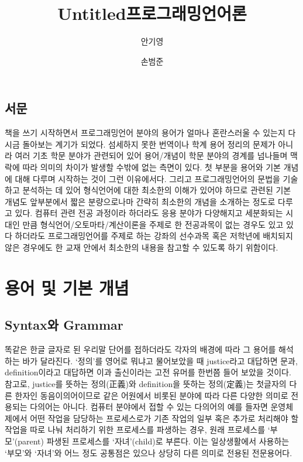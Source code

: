 \documentclass[b5paper,chapter,figtabcapt]{oblivoir}
\title{Untitled}
\title{프로그래밍언어론}
\author{안기영 \and 손범준}
\begin{document}
\maketitle

\frontmatter 

\chapter*{서문}
책을 쓰기 시작하면서 프로그래밍언어 분야의 용어가 얼마나 혼란스러울 수 있는지
다시금 돌아보는 계기가 되었다. 섬세하지 못한 번역이나 학계 용어 정리의 문제가
아니라 여러 기초 학문 분야가 관련되어 있어 용어/개념이 학문 분야의 경계를
넘나들며 맥락에 따라 의미의 차이가 발생할 수밖에 없는 측면이 있다. 첫 부분을
용어와 기본 개념에 대해 다루며 시작하는 것이 그런 이유에서다. 그리고
프로그래밍언어의 문법을 기술하고 분석하는 데 있어 형식언어에 대한 최소한의
이해가 있어야 하므로 관련된 기본 개념도 앞부분에서 짧은 분량으로나마
간략히 최소한의 개념을 소개하는 정도로 다루고 있다. 컴퓨터 관련
전공 과정이라 하더라도 응용 분야가 다양해지고 세분화되는 시대인 만큼
형식언어/오토마타/계산이론을 주제로 한 전공과목이 없는 경우도 있고
있다 하더라도 프로그래밍언어를 주제로 하는 강좌의 선수과목 혹은
저학년에 배치되지 않은 경우에도 한 교재 안에서 최소한의 내용을
참고할 수 있도록 하기 위함이다.

\newpage
\tableofcontents

\newpage
\listoffigures

\mainmatter

\part{용어 및 기본 개념}

\chapter{Syntax와 Grammar}
\label{chap:SyntaxGrammar}
똑같은 한글 글자로 된 우리말 단어를 접하더라도 각자의 배경에 따라
그 용어를 해석하는 바가 달라진다. `정의'를 영어로 뭐냐고 물어보았을 때
justice라고 대답하면 문과, definition이라고 대답하면 이과 출신이라는
고전 유머를 한번쯤 들어 보았을 것이다. 참고로,
justice를 뜻하는 정의(正義)와 definition을 뜻하는 정의(定義)는
첫글자의 다른 한자인 동음이의어이므로 같은 어원에서 비롯된
분야에 따라 다른 다양한 의미로 전용되는 다의어는 아니다.
컴퓨터 분야에서 접할 수 있는 다의어의 예를 들자면 운영체제에서
어떤 작업을 담당하는 프로세스로가 기존 작업의 일부 혹은 추가로
처리해야 할 작업을 따로 나눠 처리하기 위한 프로세스를 파생하는 경우,
원래 프로세스를 `부모'(parent) 파생된 프로세스를 `자녀'(child)로 부른다.
이는 일상생활에서 사용하는 `부모'와 `자녀'와 어느 정도 공통점은 있으나
상당히 다른 의미로 전용된 전문용어다.
\end{document}
